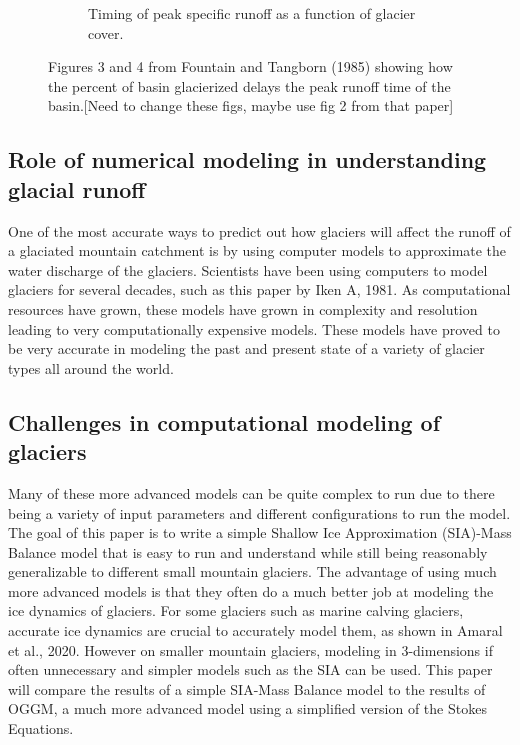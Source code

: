 \documentclass{article}
\begin{document}
\begin{figure}[h]
\begin{subfigure}[b]{0.49\textwidth}
        \caption{Timing of peak specific runoff as a function of glacier cover.}
        \label{fig:subfig2}
    \end{subfigure}
    \caption{Figures 3 and 4 from Fountain and Tangborn (1985) showing how the percent of basin glacierized delays the peak runoff time of the basin.[Need to change these figs, maybe use fig 2 from that paper]}
    \label{fig:main_figure}
\end{figure}
\FloatBarrier
\subsection{Role of numerical modeling in understanding glacial runoff}
One of the most accurate ways to predict out how glaciers will affect the runoff of a glaciated mountain catchment is by using computer 
models to approximate the water discharge of the glaciers. Scientists have been using computers to model glaciers for several decades, 
such as this paper by Iken A, 1981. As computational resources have grown, these models have grown in complexity and resolution leading 
to very computationally expensive models. These models have proved to be very accurate in modeling the past and present state of a variety 
of glacier types all around the world.

\subsection{Challenges in computational modeling of glaciers}
Many of these more advanced models can be quite complex to run due to there being a variety of input parameters and different configurations to run the model. The 
goal of this paper is to write a simple Shallow Ice Approximation (SIA)-Mass Balance model that is easy to run and understand while still 
being reasonably generalizable to different small mountain glaciers. The advantage of using much more advanced models is that they often do 
a much better job at modeling the ice dynamics of glaciers. For some glaciers such as marine calving glaciers, accurate ice dynamics are 
crucial to accurately model them, as shown in Amaral et al., 2020. However on smaller mountain glaciers, modeling in 3-dimensions if often 
unnecessary and simpler models such as the SIA can be used. This paper will compare the results of a simple SIA-Mass Balance model to the 
results of OGGM, a much more advanced model using a simplified version of the Stokes Equations.
\end{document}

